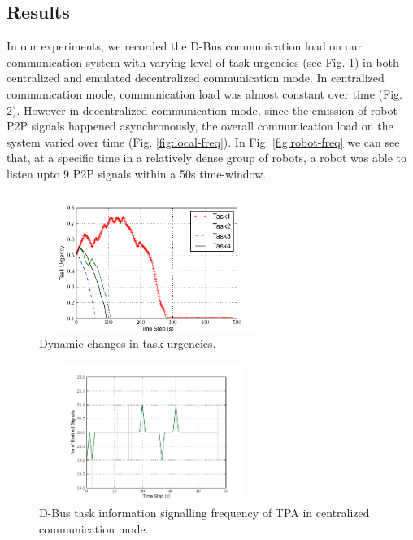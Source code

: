 \documentclass[draft]{ifacconf}
\begin{document}
\subsection{Results}
In our experiments, we recorded the D-Bus communication load on our communication system with varying level of task urgencies (see Fig. \ref{fig:task-urgency}) in both centralized and emulated decentralized communication mode. In  centralized communication mode, communication load was almost constant over time (Fig. \ref{fig:global-freq}).  However in decentralized communication mode, since the emission of robot P2P signals happened asynchronously, the overall communication load on the system varied over time (Fig. \ref{fig:local-freq}). In Fig. \ref{fig:robot-freq} we can see that, at a specific time in a relatively dense group of robots, a robot was able to listen upto 9 P2P signals within a 50s time-window.
\begin{figure}
\centering
\includegraphics[width=7.5cm,height=4.5cm]{./images/PlotUrgencyLog-2010Feb15-171017}    %
\caption{Dynamic changes in task urgencies.} 
\label{fig:task-urgency}
\end{figure}
\begin{figure}
\begin{center}
\includegraphics[width=7.5cm,height=4.5cm]{./images/Global-SignalingFreqStat}    %
\caption{D-Bus task information signalling frequency of TPA in centralized communication mode.} 
\label{fig:global-freq}
\end{center}
\end{figure}
\end{document}
